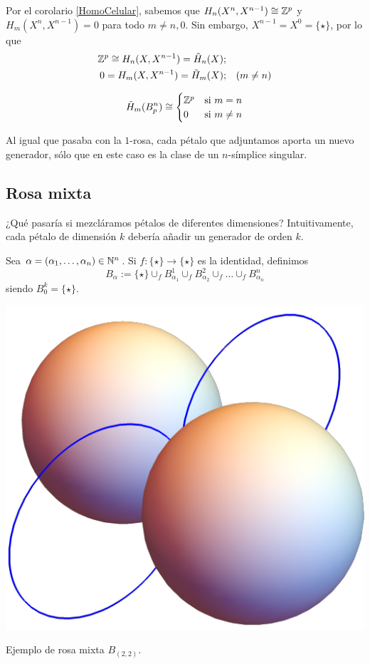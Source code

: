 Por el corolario \ref{HomoCelular}, sabemos que $H_n(X^n,X^{n-1})\cong 
\mathbb{Z}^p$ y\\ $H_m(X^n,X^{n-1})=0$ para todo $m\neq n,0$. Sin embargo, $X^{n-1}
=X^0=\{\star\}$, por lo que
\begin{align*}
\mathbb{Z}^p\cong H_n(X,X^{n-1})=\tilde H_n(X);\\
0=H_m(X,X^{n-1})=\tilde H_m(X); && (m\neq n)
\end{align*}

\begin{theorem}
\[\tilde H_m(B^n_p)\cong
\begin{cases}
\mathbb{Z}^p & \text{si $m=n$}\\
0 & \text{si $m\neq n$}
\end{cases}\]
\end{theorem}

Al igual que pasaba con la $1$-rosa, cada pétalo que adjuntamos aporta un nuevo
generador, sólo que en este caso es la clase de un $n$-símplice singular.

\subsection{Rosa mixta}
¿Qué pasaría si mezcláramos pétalos de diferentes dimensiones? Intuitivamente,
cada pétalo de dimensión $k$ debería añadir un generador de orden $k$.

Sea $\alpha=(\alpha_1,\dots,\alpha_n) \in \mathbb{N}^n$. Si $f\colon \{\star\} \to
\{\star\}$ es la identidad, definimos
\[B_\alpha:=\{\star\}\cup_f B^1_{\alpha_1}\cup_f B^2_{\alpha_2}\cup_f \dots
\cup_f B^n_{\alpha_n}\]
siendo $B^k_0=\{\star\}$.

\begin{marginfigure}
\includegraphics{Figures/B22.png}
\caption{Ejemplo de rosa mixta $B_{(2,2)}$.}
\end{marginfigure}

